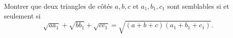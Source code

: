 Montrer que deux triangles de côtés $a, b, c$ et $a_1, b_1, c_1$ sont semblables si et seulement si
\[ \sqrt{aa_1} + \sqrt{bb_1} + \sqrt{cc_1} = \sqrt{(a + b + c)(a_1 + b_1 + c_1)}. \]
